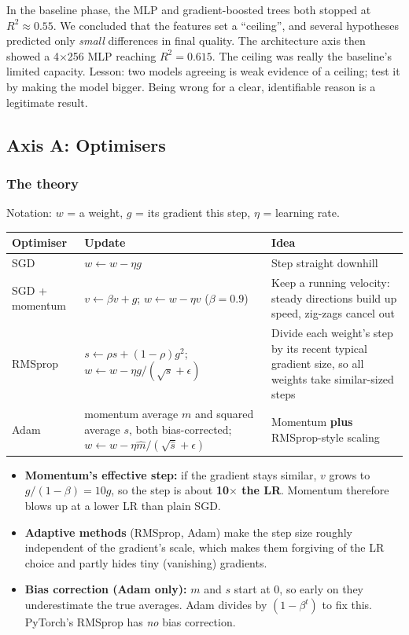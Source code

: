 \documentclass[11pt,a4paper]{article}
\begin{document}
\begin{keyidea}
In the baseline phase, the MLP and gradient-boosted trees both stopped at $R^2 \approx 0.55$. We concluded that the
features set a ``ceiling'', and several hypotheses predicted only \emph{small} differences in final quality. The
architecture axis then showed a 4$\times$256 MLP reaching $R^2 = 0.615$. The ceiling was really the baseline's limited
capacity. Lesson: two models agreeing is weak evidence of a ceiling; test it by making the model bigger. Being wrong for
a clear, identifiable reason is a legitimate result.
\end{keyidea}

\subsection{Axis A: Optimisers}

\subsubsection*{The theory}
Notation: $w$ = a weight, $g$ = its gradient this step, $\eta$ = learning rate.

\begin{tabularx}{\linewidth}{@{}lp{5.3cm}Y@{}}
\toprule
Optimiser & Update & Idea \\
\midrule
SGD & $w \leftarrow w - \eta g$ & Step straight downhill \\
SGD + momentum & $v \leftarrow \beta v + g$; \; $w \leftarrow w - \eta v$ \; ($\beta = 0.9$) & Keep a running velocity: steady directions build up speed, zig-zags cancel out \\
RMSprop & $s \leftarrow \rho s + (1-\rho) g^2$; \; $w \leftarrow w - \eta g/(\sqrt{s}+\epsilon)$ & Divide each weight's step by its recent typical gradient size, so all weights take similar-sized steps \\
Adam & momentum average $m$ and squared average $s$, both bias-corrected; $w \leftarrow w - \eta \hat m / (\sqrt{\hat s}+\epsilon)$ & Momentum \textbf{plus} RMSprop-style scaling \\
\bottomrule
\end{tabularx}
\begin{itemize}
  \item \textbf{Momentum's effective step:} if the gradient stays similar, $v$ grows to $g / (1-\beta) = 10g$, so the step
        is about \textbf{10$\times$ the LR}. Momentum therefore blows up at a lower LR than plain SGD.
  \item \textbf{Adaptive methods} (RMSprop, Adam) make the step size roughly independent of the gradient's scale, which
        makes them forgiving of the LR choice and partly hides tiny (vanishing) gradients.
  \item \textbf{Bias correction (Adam only):} $m$ and $s$ start at 0, so early on they underestimate the true averages.
        Adam divides by $(1 - \beta^t)$ to fix this. PyTorch's RMSprop has \emph{no} bias correction.
\end{itemize}
\end{document}
